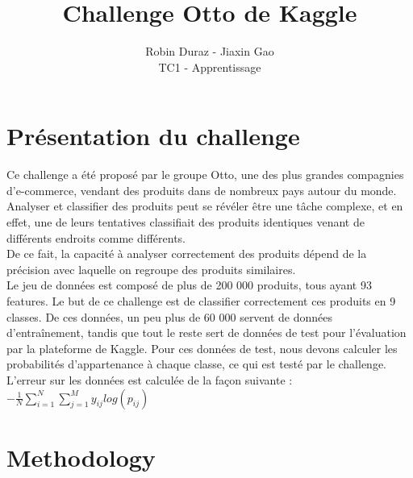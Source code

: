 \documentclass[12pt]{article}
\begin{document}
 
 
\title{Challenge Otto de Kaggle}%
\author{Robin Duraz - Jiaxin Gao\\ %
TC1 - Apprentissage} %
 
\maketitle
\vspace{2cm}
\section{Présentation du challenge}

Ce challenge a été proposé par le groupe Otto, une des plus grandes compagnies
d'e-commerce, vendant des produits dans de nombreux pays autour du monde.
Analyser et classifier des produits peut se révéler être une tâche complexe, et
en effet, une de leurs tentatives classifiait des produits identiques venant de
différents endroits comme différents.\\
De ce fait, la capacité à analyser correctement des produits dépend de la
précision avec laquelle on regroupe des produits similaires.\\

Le jeu de données est composé de plus de 200 000 produits, tous ayant 93
features. Le but de ce challenge est de classifier correctement ces produits en
9 classes. De ces données, un peu plus de 60 000 servent de données
d'entraînement, tandis que tout le reste sert de données de test pour
l'évaluation par la plateforme de Kaggle. Pour ces données de test, nous devons
calculer les probabilités d'appartenance à chaque classe, ce qui est testé par
le challenge.\\

L'erreur sur les données est calculée de la façon suivante : \\
$-\frac{1}{N}\sum\limits_{i = 1}^N\sum\limits_{j = 1}^M y_{ij}log(p_{ij})$

\section{Methodology}
\end{document}
